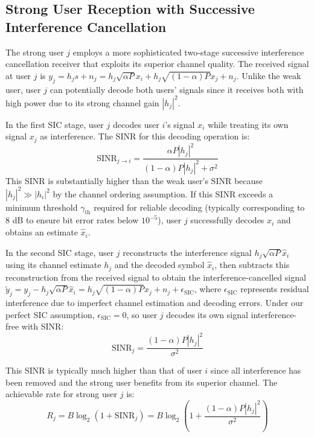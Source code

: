 \subsection{Strong User Reception with Successive Interference Cancellation}

The strong user $j$ employs a more sophisticated two-stage successive interference cancellation receiver that exploits its superior channel quality. The received signal at user $j$ is $y_j = h_j s + n_j = h_j \sqrt{\alpha P} x_i + h_j \sqrt{(1-\alpha) P} x_j + n_j$. Unlike the weak user, user $j$ can potentially decode both users' signals since it receives both with high power due to its strong channel gain $|h_j|^2$.

In the first SIC stage, user $j$ decodes user $i$'s signal $x_i$ while treating its own signal $x_j$ as interference. The SINR for this decoding operation is:
\begin{equation}
\text{SINR}_{j \to i} = \frac{\alpha P |h_j|^2}{(1-\alpha) P |h_j|^2 + \sigma^2}
\end{equation}
This SINR is substantially higher than the weak user's SINR because $|h_j|^2 \gg |h_i|^2$ by the channel ordering assumption. If this SINR exceeds a minimum threshold $\gamma_{\text{th}}$ required for reliable decoding (typically corresponding to 8 dB to ensure bit error rates below $10^{-5}$), user $j$ successfully decodes $x_i$ and obtains an estimate $\hat{x}_i$.

In the second SIC stage, user $j$ reconstructs the interference signal $h_j \sqrt{\alpha P} \hat{x}_i$ using its channel estimate $h_j$ and the decoded symbol $\hat{x}_i$, then subtracts this reconstruction from the received signal to obtain the interference-cancelled signal $\tilde{y}_j = y_j - h_j \sqrt{\alpha P} \hat{x}_i = h_j \sqrt{(1-\alpha) P} x_j + n_j + \epsilon_{\text{SIC}}$, where $\epsilon_{\text{SIC}}$ represents residual interference due to imperfect channel estimation and decoding errors. Under our perfect SIC assumption, $\epsilon_{\text{SIC}} = 0$, so user $j$ decodes its own signal interference-free with SINR:
\begin{equation}
\text{SINR}_j = \frac{(1-\alpha) P |h_j|^2}{\sigma^2}
\end{equation}

This SINR is typically much higher than that of user $i$ since all interference has been removed and the strong user benefits from its superior channel. The achievable rate for strong user $j$ is:
\begin{equation}
R_j = B \log_2(1 + \text{SINR}_j) = B \log_2\left(1 + \frac{(1-\alpha) P |h_j|^2}{\sigma^2}\right)
\end{equation}

